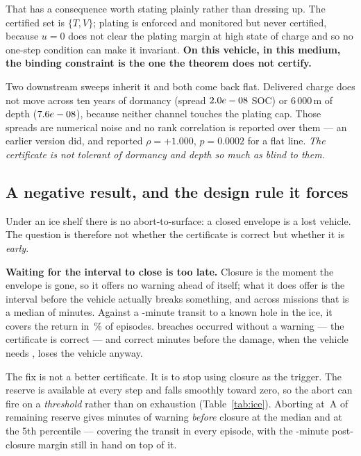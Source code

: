 \documentclass[11pt,letterpaper]{article}
\theoremstyle{definition}
\theoremstyle{remark}
\begin{document}
That has a consequence worth stating plainly rather than dressing up. The certified set is
$\{T, V\}$; plating is enforced and monitored but never certified, because $u=0$ does not clear
the plating margin at high state of charge and so no one-step condition can make it invariant.
\textbf{On this vehicle, in this medium, the binding constraint is the one the theorem does not
certify.}

Two downstream sweeps inherit it and both come back flat. Delivered charge does not move across
ten years of dormancy (spread $2.0e-08$ SOC) or 6\,000\,m of depth ($7.6e-08$),
because neither channel touches the plating cap. Those spreads are numerical noise and no rank
correlation is reported over them --- an earlier version did, and reported $\rho=+1.000$,
$p=0.0002$ for a flat line. \emph{The certificate is not tolerant of dormancy and depth so much
as blind to them.}

\subsection{A negative result, and the design rule it forces}\label{sec:ice}

Under an ice shelf there is no abort-to-surface: a closed envelope is a lost vehicle. The
question is therefore not whether the certificate is correct but whether it is \emph{early}.

\textbf{Waiting for the interval to close is too late.} Closure is the moment the envelope is
gone, so it offers no warning ahead of itself; what it does offer is the interval before the
vehicle actually breaks something, and across \uIceN{} missions that is a median of
\uIceClosureMed{} minutes. Against a \uIceTransit{}-minute transit to a known hole in the ice,
it covers the return in \uIceCover\,\% of episodes. \uIceNoWarn{} breaches occurred without a
warning --- the certificate is correct --- and correct \uIceClosureMed{} minutes before the
damage, when the vehicle needs \uIceTransit{}, loses the vehicle anyway.

The fix is not a better certificate. It is to stop using closure as the trigger. The reserve is
available at every step and falls smoothly toward zero, so the abort can fire on a
\emph{threshold} rather than on exhaustion (Table~\ref{tab:ice}). Aborting at \uIceThresh\,A of remaining reserve gives \uIceThreshMed{} minutes of warning
\emph{before} closure at the median and \uIceThreshPfive{} at the 5th percentile --- covering the
transit in every episode, with the \uIceClosureMed{}-minute post-closure margin still in hand on
top of it.
\end{document}
